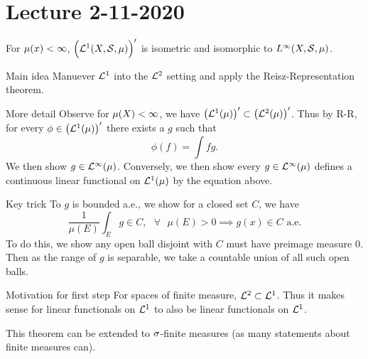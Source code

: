 \section{Lecture 2-11-2020}
\begin{thm}
For $\mu(x) < \infty$, $\Big({\mathcal L}^1(X, {\mathcal S}, \mu)\Big)'$ is isometric and isomorphic to $L^\infty(X, {\mathcal S}, \mu)$.
\end{thm}
\begin{details}{Main idea}
Manuever ${\mathcal L}^1$ into the ${\mathcal L}^2$ setting and apply the Reisz-Representation theorem.
\end{details}
\begin{details}{More detail}
Observe for $\mu(X) < \infty$, we have $\big({\mathcal L}^1(\mu)\big)' \subset \big({\mathcal L}^2(\mu)\big)'$. Thus by R-R, for every $\phi \in \big({\mathcal L}^1(\mu)\big)'$ there exists a $g$ such that
\[
    \phi(f) = \int fg.
\]
We then show $g \in {\mathcal L}^\infty(\mu)$. Conversely, we then show every $g \in {\mathcal L}^\infty(\mu)$ defines a continuous linear functional on ${\mathcal L}^1(\mu)$ by the equation above.
\end{details}

\begin{details}{Key trick}
To $g$ is bounded a.e., we show for a closed set $C$, we have
\[
    \frac{1}{\mu(E)}\int_E g \in C, \text{  } \forall \text{ } \mu(E) > 0 \implies g(x) \in C \text{ a.e.}
\]
To do this, we show any open ball disjoint with $C$ must have preimage measure 0. Then as the range of $g$ is separable, we take a countable union of all such open balls.
\end{details}

\begin{details}{Motivation for first step}
For spaces of finite measure, ${\mathcal L}^2 \subset {\mathcal L}^1$. Thus it makes sense for linear functionals on ${\mathcal L}^1$ to also be linear functionals on ${\mathcal L}^1$.
\end{details}

\begin{remark}
This theorem can be extended to $\sigma$-finite measures (as many statements about finite measures can).
\end{remark}
